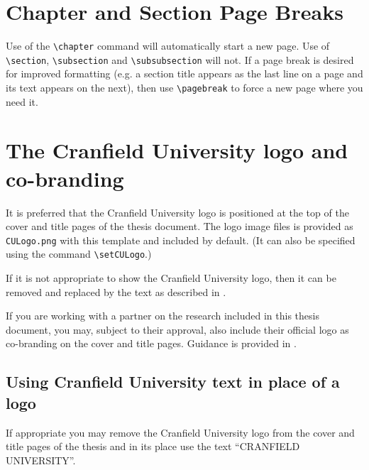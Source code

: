 \documentclass[12pt,oneside]{book} %
\begin{document}
\section{Chapter and Section Page Breaks}
Use of the \verb#\chapter# command will automatically start a new page. Use of \verb#\section#, \verb#\subsection#  and \verb#\subsubsection# will not. If a page break is desired for improved formatting (e.g. a section title appears as the last line on a page and its text appears on the next), then use \verb#\pagebreak# to force a new page where you need it.  


\section{The Cranfield University logo and co-branding}
It is preferred that the Cranfield University logo is positioned at the top of the cover and title pages of the thesis document. The logo image files is provided as \verb#CULogo.png# with this template and included by default. (It can also be specified using the command \verb#\setCULogo#.)

If it is not appropriate to show the Cranfield University logo, then it can be removed and replaced by the text as described in .

If you are working with a partner on the research included in this thesis document, you may, subject to their approval, also include their official logo as co-branding on the cover and title pages. Guidance is provided in .



\subsection{Using Cranfield University text in place of a logo}
\label{sec:UseCUText}
If appropriate you may remove the Cranfield University logo from the cover and title pages of the thesis and in its place use the text “CRANFIELD UNIVERSITY”.
\end{document}
